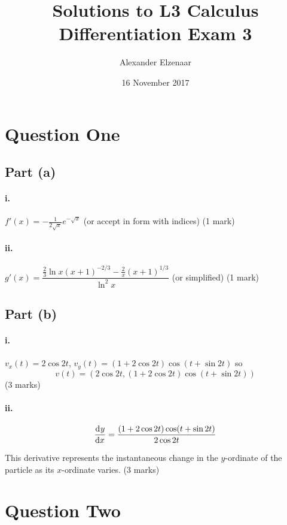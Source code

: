 \documentclass[a4paper]{report}
\title{Solutions to L3 Calculus Differentiation Exam 3}
\author{Alexander Elzenaar}
\date{16 November 2017}
\begin{document}
\maketitle

\section*{Question One}
\subsection*{Part (a)}
\paragraph{i.}
$ f'(x) = -\frac{1}{2\sqrt{x}} e^{-\sqrt{x}} $ (or accept in form with indices) (1 mark)

\paragraph{ii.}
$ g'(x) = \dfrac{\frac{2}{3} \ln x (x + 1)^{-2/3} - \frac{2}{x} (x+1)^{1/3}}{\ln^2 x} $ (or simplified) (1 mark)

\subsection*{Part (b)}
\paragraph{i.}
$ v_x(t) = 2\cos 2t $, $ v_y(t) = (1 + 2\cos 2t)\cos(t + \sin 2t) $ so
\begin{displaymath}
  v(t) = \left(2\cos 2t, (1 + 2\cos 2t)\cos(t + \sin 2t)\right)
\end{displaymath}
(3 marks)

\paragraph{ii.}
\begin{displaymath}
  \dod{y}{x} = \frac{(1 + 2\cos 2t)\cos(t + \sin 2t)}{2\cos 2t}
\end{displaymath}

This derivative represents the instantaneous change in the $ y$-ordinate of the particle as its $ x$-ordinate varies. (3 marks)

\section*{Question Two}
\end{document}
